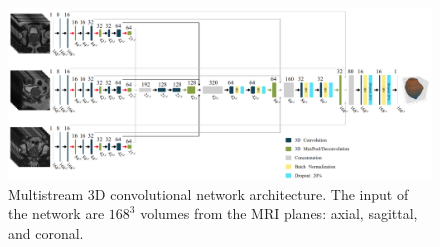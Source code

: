 \begin{figure}[h]
    \centering
    \includegraphics[totalheight=.275\textheight]{imgs/methodology/NN.png}
    \caption{Multistream 3D convolutional network architecture. The input of the network are $168^3$ volumes from the MRI planes: axial, sagittal, and coronal. }
    \label{fig:nn}
\end{figure}

